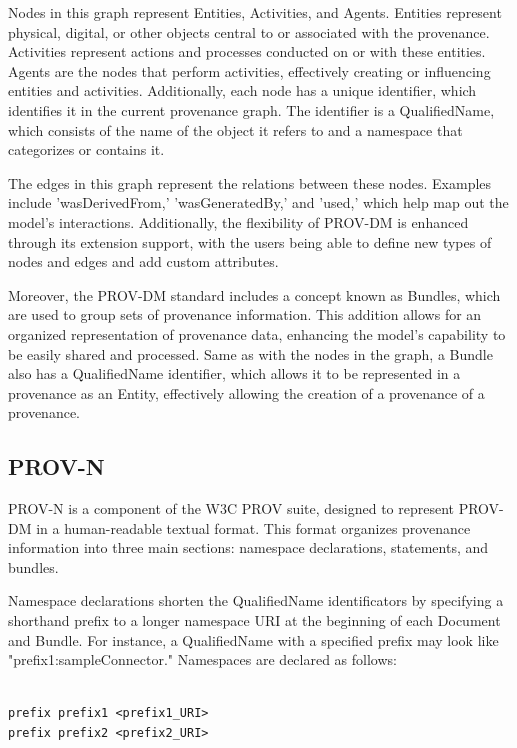 \documentclass[
  digital,     %
  oneside,     %
  nosansbold,  %
  nocolorbold, %
  lof,         %
  lot,         %
]{fithesis4}
\begin{document}
Nodes in this graph represent Entities, Activities, and Agents. Entities represent physical, digital, or other objects central to or associated with the provenance. Activities represent actions and processes conducted on or with these entities. Agents are the nodes that perform activities, effectively creating or influencing entities and activities. Additionally, each node has a unique identifier, which identifies it in the current provenance graph. The identifier is a QualifiedName, which consists of the name of the object it refers to and a namespace that categorizes or contains it.

The edges in this graph represent the relations between these nodes. Examples include 'wasDerivedFrom,' 'wasGeneratedBy,' and 'used,' which help map out the model's interactions. Additionally, the flexibility of PROV-DM is enhanced through its extension support, with the users being able to define new types of nodes and edges and add custom attributes.

Moreover, the PROV-DM standard includes a concept known as Bundles, which are used to group sets of provenance information. This addition allows for an organized representation of provenance data, enhancing the model's capability to be easily shared and processed. Same as with the nodes in the graph, a Bundle also has a QualifiedName identifier, which allows it to be represented in a provenance as an Entity, effectively allowing the creation of a provenance of a provenance.
\shorthandon{-}

\subsection{PROV-N}
\shorthandoff{-}
PROV-N is a component of the W3C PROV suite, designed to represent PROV-DM in a human-readable textual format. This format organizes provenance information into three main sections: namespace declarations, statements, and bundles. 

Namespace declarations shorten the QualifiedName identificators by specifying a shorthand prefix to a longer namespace URI at the beginning of each Document and Bundle. For instance, a QualifiedName with a specified prefix may look like "prefix1:sampleConnector." Namespaces are declared as follows:

\begin{verbatim}

prefix prefix1 <prefix1_URI>
prefix prefix2 <prefix2_URI>

\end{verbatim}
\end{document}
